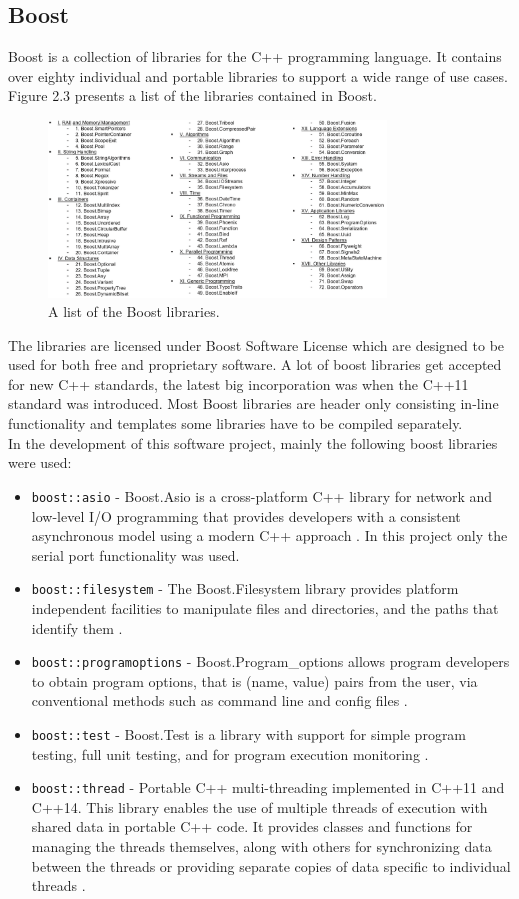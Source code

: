 \subsection{Boost}
Boost is a collection of libraries for the C++ programming language. It contains over eighty individual and portable libraries to support a wide range of use cases. Figure 2.3 presents a list of the libraries contained in Boost.
\begin{figure}[h]
\centering
      \includegraphics[width=0.8\textwidth]{boost}
        \caption{A list of the Boost libraries.}
\end{figure}
The libraries are licensed under Boost Software License \cite{boostliz} which are designed to be used for both free and proprietary software. A lot of boost libraries get accepted for new C++ standards, the latest big incorporation was when the C++11 standard was introduced. Most Boost libraries are header only consisting in-line functionality and templates some libraries have to be compiled separately.\\
In the development of this software project, mainly the following boost libraries were used:
\begin{itemize}
\item \texttt{boost::asio} - Boost.Asio is a cross-platform C++ library for network and low-level I/O programming that provides developers with a consistent asynchronous model using a modern C++ approach \cite{boost_asio}. In this project only the serial port functionality was used.
\item \texttt{boost::filesystem} - The Boost.Filesystem library provides platform independent facilities to manipulate files and directories, and the paths that identify them \cite{boost_files}.
\item \texttt{boost::programoptions} - Boost.Program\_options allows program developers to obtain program options, that is (name, value) pairs from the user, via conventional methods such as command line and config files \cite{boost_po}. 
\item \texttt{boost::test} - Boost.Test is a library with support for simple program testing, full unit testing, and for program execution monitoring \cite{boost_test}.
\item \texttt{boost::thread} - Portable C++ multi-threading implemented in C++11 and C++14. This library  enables the use of multiple threads of execution with shared data in portable C++ code. It provides classes and functions for managing the threads themselves, along with others for synchronizing data between the threads or providing separate copies of data specific to individual threads \cite{boost_thread}. 
\end{itemize}
